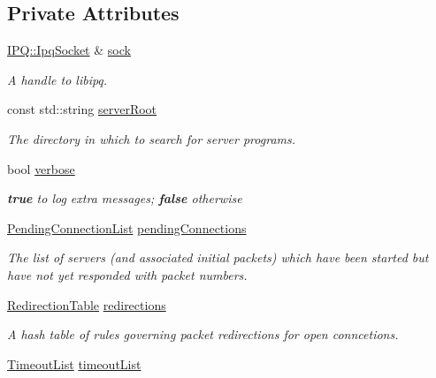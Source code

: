\subsection*{\-Private \-Attributes}
\begin{DoxyCompactItemize}
\item 
\hyperlink{classIPQ_1_1IpqSocket}{\-I\-P\-Q\-::\-Ipq\-Socket} \& \hyperlink{classNERD_1_1ConnectionServer_ad9575a11fd2db34b92ab1627c2d1d5b0}{sock}
\begin{DoxyCompactList}\small\item\em \-A handle to libipq. \end{DoxyCompactList}\item 
const std\-::string \hyperlink{classNERD_1_1ConnectionServer_a5e476e6dd3a15d073b4a3f75569dc240}{server\-Root}
\begin{DoxyCompactList}\small\item\em \-The directory in which to search for server programs. \end{DoxyCompactList}\item 
bool \hyperlink{classNERD_1_1ConnectionServer_a36f12900d6c2461984a1e093bfc42403}{verbose}
\begin{DoxyCompactList}\small\item\em {\bfseries true} to log extra messages; {\bfseries false} otherwise \end{DoxyCompactList}\item 
\hyperlink{classNERD_1_1ConnectionServer_ac838d247f33cef856ae722343a8cb7ff}{\-Pending\-Connection\-List} \hyperlink{classNERD_1_1ConnectionServer_ad051d0ac714b53904e86c368cd90275c}{pending\-Connections}
\begin{DoxyCompactList}\small\item\em \-The list of servers (and associated initial packets) which have been started but have not yet responded with packet numbers. \end{DoxyCompactList}\item 
\hyperlink{classNERD_1_1ConnectionServer_a1f7b6abdda0f0a7a027a5f2e24727cee}{\-Redirection\-Table} \hyperlink{classNERD_1_1ConnectionServer_a4186be4b373165c72ab81a73165cb075}{redirections}
\begin{DoxyCompactList}\small\item\em \-A hash table of rules governing packet redirections for open conncetions. \end{DoxyCompactList}\item 
\hyperlink{classNERD_1_1ConnectionServer_a63d211040487b4566f2f696026723932}{\-Timeout\-List} \hyperlink{classNERD_1_1ConnectionServer_adc22ef94ff5d014433eef07e054e1d69}{timeout\-List}

\end{DoxyCompactItemize}
